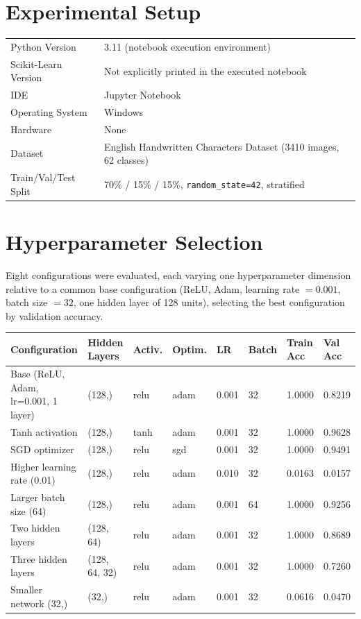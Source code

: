 \documentclass[12pt,a4paper]{article}
\begin{document}
\section{Experimental Setup}
\begin{tabular}{ll}
\toprule
Python Version & 3.11 (notebook execution environment) \\
Scikit-Learn Version & Not explicitly printed in the executed notebook \\
IDE & Jupyter Notebook \\
Operating System & Windows \\
Hardware & None \\
Dataset & English Handwritten Characters Dataset (3410 images, 62 classes) \\
Train/Val/Test Split & 70\% / 15\% / 15\%, \texttt{random\_state=42}, stratified \\
\bottomrule
\end{tabular}

\section{Hyperparameter Selection}

Eight configurations were evaluated, each varying one hyperparameter dimension relative to a
common base configuration (ReLU, Adam, learning rate $=0.001$, batch size $=32$, one hidden
layer of 128 units), selecting the best configuration by validation accuracy.

\begin{longtable}{p{4.3cm}p{2.3cm}p{1.4cm}p{1.4cm}p{1.6cm}p{1.5cm}p{1.5cm}p{1.5cm}}
\toprule
Configuration & Hidden Layers & Activ. & Optim. & LR & Batch & Train Acc & Val Acc \\
\midrule
Base (ReLU, Adam, lr=0.001, 1 layer) & (128,) & relu & adam & 0.001 & 32 & 1.0000 & 0.8219 \\
Tanh activation & (128,) & tanh & adam & 0.001 & 32 & 1.0000 & 0.9628 \\
SGD optimizer & (128,) & relu & sgd & 0.001 & 32 & 1.0000 & 0.9491 \\
Higher learning rate (0.01) & (128,) & relu & adam & 0.010 & 32 & 0.0163 & 0.0157 \\
Larger batch size (64) & (128,) & relu & adam & 0.001 & 64 & 1.0000 & 0.9256 \\
Two hidden layers & (128, 64) & relu & adam & 0.001 & 32 & 1.0000 & 0.8689 \\
Three hidden layers & (128, 64, 32) & relu & adam & 0.001 & 32 & 1.0000 & 0.7260 \\
Smaller network (32,) & (32,) & relu & adam & 0.001 & 32 & 0.0616 & 0.0470 \\
\bottomrule
\end{longtable}
\end{document}
